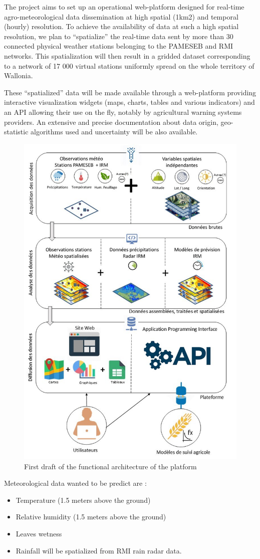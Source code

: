 \documentclass[12pt,twoside]{reedthesis}
\providecommand{\tightlist}{%
  \setlength{\itemsep}{0pt}\setlength{\parskip}{0pt}}
\theoremstyle{definition}
\theoremstyle{definition}
\theoremstyle{definition}
\theoremstyle{remark}
\begin{document}
The project aims to set up an operational web-platform designed for
real-time agro-meteorological data dissemination at high spatial (1km2)
and temporal (hourly) resolution. To achieve the availability of data at
such a high spatial resolution, we plan to ``spatialize'' the real-time
data sent by more than 30 connected physical weather stations belonging
to the PAMESEB and RMI networks. This spatialization will then result in
a gridded dataset corresponding to a network of 17 000 virtual stations
uniformly spread on the whole territory of Wallonia.

These ``spatialized'' data will be made available through a web-platform
providing interactive visualization widgets (maps, charts, tables and
various indicators) and an API allowing their use on the fly, notably by
agricultural warning systems providers. An extensive and precise
documentation about data origin, geo-statistic algorithms used and
uncertainty will be also available.
\begin{figure}

{\centering \includegraphics[width=0.65\linewidth]{figure/agromet} 

}

\caption{First draft of the functional architecture of the platform}\label{fig:agromet}
\end{figure}
Meteorological data wanted to be predict are :
\begin{itemize}
\tightlist
\item
  Temperature (1.5 meters above the ground)
\item
  Relative humidity (1.5 meters above the ground)
\item
  Leaves wetness
\item
  Rainfall will be spatialized from RMI rain radar data.
\end{itemize}
\end{document}
